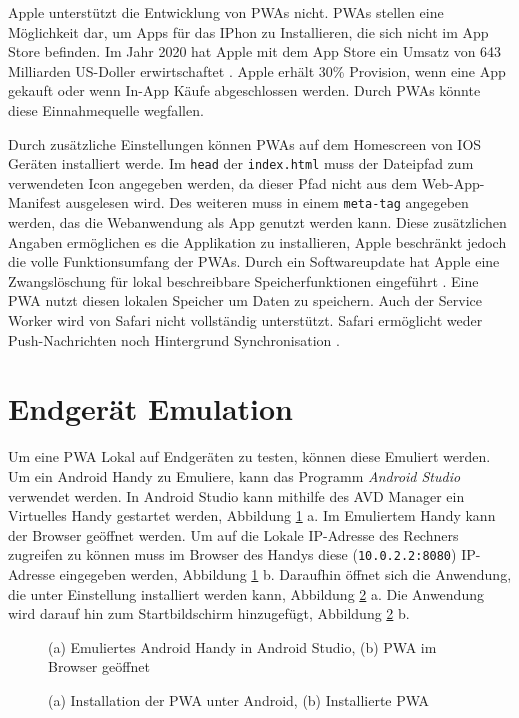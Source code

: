 Apple unterstützt die Entwicklung von PWAs nicht. PWAs stellen  eine Möglichkeit dar, um Apps für das IPhon zu Installieren, die sich nicht im App Store befinden. Im Jahr 2020 hat Apple mit dem App Store ein Umsatz von 643 Milliarden US-Doller erwirtschaftet \cite{Kirchenbauer2021}. Apple erhält 30\% Provision, wenn eine App gekauft oder wenn In-App Käufe abgeschlossen werden. Durch PWAs könnte diese Einnahmequelle wegfallen. 

Durch zusätzliche Einstellungen können PWAs auf dem Homescreen von IOS Geräten installiert werde. Im \texttt{head} der \texttt{index.html} muss der Dateipfad zum verwendeten Icon angegeben werden, da dieser Pfad nicht aus dem Web-App-Manifest ausgelesen wird. 
Des weiteren muss in einem \texttt{meta-tag} angegeben werden, das die Webanwendung als App genutzt werden kann. Diese zusätzlichen Angaben ermöglichen es die Applikation zu installieren, Apple beschränkt jedoch die volle Funktionsumfang der PWAs. Durch ein Softwareupdate hat Apple eine Zwangslöschung für lokal beschreibbare Speicherfunktionen eingeführt \cite{t3n2020}. Eine PWA nutzt diesen lokalen Speicher um Daten zu speichern. 
Auch der Service Worker wird von Safari nicht vollständig unterstützt. Safari ermöglicht weder Push-Nachrichten noch Hintergrund Synchronisation \cite{mediaevent}. 



\section{Endgerät Emulation }

Um eine PWA Lokal auf Endgeräten zu testen, können diese Emuliert werden.           
Um ein Android Handy zu Emuliere, kann das Programm \textit{Android Studio} verwendet werden. In Android Studio kann mithilfe des \ac{AVD Manager} ein Virtuelles Handy gestartet werden, Abbildung \ref{Android1} a. Im Emuliertem Handy kann der Browser geöffnet werden. Um auf die Lokale IP-Adresse des Rechners zugreifen zu können muss im Browser des Handys diese (\texttt{10.0.2.2:8080}) IP-Adresse eingegeben werden, Abbildung \ref{Android1} b. Daraufhin öffnet sich die Anwendung, die unter Einstellung installiert werden kann, Abbildung \ref{Android2} a. Die Anwendung wird darauf hin zum Startbildschirm hinzugefügt, Abbildung \ref{Android2} b.  

\begin{figure}[!htb]
    \centering
    \qquad
    \caption{(a) Emuliertes Android Handy in Android Studio, (b) PWA im Browser geöffnet}
    \label{Android1}
\end{figure}

\begin{figure}[!htb]
    \centering
    \qquad
    \caption{(a) Installation der PWA unter Android, (b) Installierte PWA }
    \label{Android2}
\end{figure}